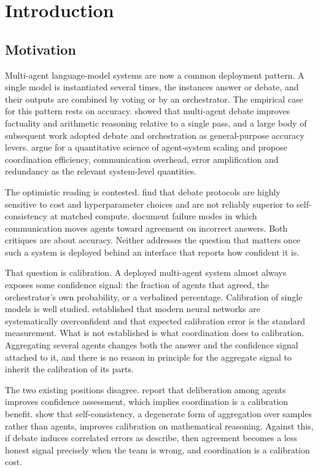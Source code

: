 \section{Introduction}
\label{sec:intro}

\subsection{Motivation}

Multi-agent language-model systems are now a common deployment pattern. A single model
is instantiated several times, the instances answer or debate, and their outputs are
combined by voting or by an orchestrator. The empirical case for this pattern rests on
accuracy. \citet{du2023debate} showed that multi-agent debate improves factuality and
arithmetic reasoning relative to a single pass, and a large body of subsequent work
adopted debate and orchestration as general-purpose accuracy levers.
\citet{kim2025scaling} argue for a quantitative science of agent-system scaling and
propose coordination efficiency, communication overhead, error amplification and
redundancy as the relevant system-level quantities.

The optimistic reading is contested. \citet{smit2024debate} find that debate protocols
are highly sensitive to cost and hyperparameter choices and are not reliably superior to
self-consistency at matched compute. \citet{wynn2025debate} document failure modes in
which communication moves agents toward agreement on incorrect answers. Both critiques
are about accuracy. Neither addresses the question that matters once such a system is
deployed behind an interface that reports how confident it is.

That question is calibration. A deployed multi-agent system almost always exposes some
confidence signal: the fraction of agents that agreed, the orchestrator's own
probability, or a verbalized percentage. Calibration of single models is well studied.
\citet{guo2017calibration} established that modern neural networks are systematically
overconfident and that expected calibration error is the standard measurement. What is
not established is what coordination does to calibration. Aggregating several agents
changes both the answer and the confidence signal attached to it, and there is no reason
in principle for the aggregate signal to inherit the calibration of its parts.

The two existing positions disagree. \citet{yang2024collaborative} report that
deliberation among agents improves confidence assessment, which implies coordination is
a calibration benefit. \citet{wang2024calibrating} show that self-consistency, a
degenerate form of aggregation over samples rather than agents, improves calibration on
mathematical reasoning. Against this, if debate induces correlated errors as
\citet{wynn2025debate} describe, then agreement becomes a less honest signal precisely
when the team is wrong, and coordination is a calibration cost.

